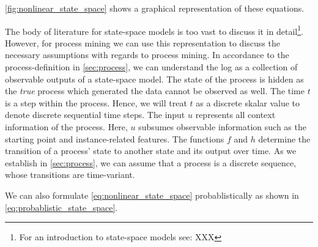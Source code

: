 \documentclass[12pt,a4paper]{report}
\begin{document}
\autoref{fig:nonlinear_state_space} shows a graphical representation of these equations.

The body of literature for state-space models is too vast to discuss it in detail\footnote{For an introduction to state-space models see: XXX}. However, for process mining we can use this representation to discuss the necessary assumptions with regards to process mining.
In accordance to the process-definition in \autoref{sec:process}, we can understand the \gls{log} as a collection of observable outputs of a state-space model. The state of the process is hidden as the \emph{true} process which generated the data cannot be observed as well. The time $t$ is a step within the process. Hence, we will treat $t$ as a discrete skalar value to denote discrete sequential time steps. The input $u$ represents all context information of the process. Here, $u$ subsumes observable information such as the starting point and \gls{instance}-related features. The functions $f$ and $h$ determine the transition of a process' state to another state and its output over time. As we establish in \autoref{sec:process}, we can assume that a process is a discrete sequence, whose transitions are time-variant.


We can also formulate \autoref{eq:nonlinear_state_space} probablistically as shown in \autoref{eq:probablistic_state_space}.
\end{document}
